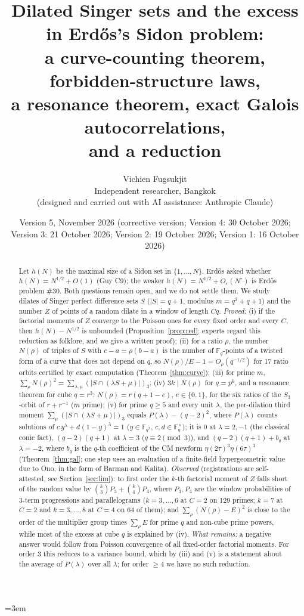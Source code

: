 \documentclass[11pt]{article}
\title{Dilated Singer sets and the excess in Erd\H{o}s's Sidon problem:\\ a curve-counting theorem, forbidden-structure laws,\\ a resonance theorem, exact Galois autocorrelations,\\ and a reduction}
\author{Vichien Fugsukjit\\ Independent researcher, Bangkok\\ \small(designed and carried out with AI assistance: Anthropic Claude)}
\date{Version 5, November 2026 (corrective version; Version 4: 30 October 2026; Version 3: 21 October 2026; Version 2: 19 October 2026; Version 1: 16 October 2026)}
\begin{document}
\emergencystretch=3em
\maketitle
\begin{abstract}
Let $h(N)$ be the maximal size of a Sidon set in $\{1,\dots,N\}$. Erd\H{o}s asked whether $h(N)=N^{1/2}+O(1)$ (Guy C9); the weaker
$h(N)=N^{1/2}+O_\varepsilon(N^\varepsilon)$ is Erd\H{o}s problem \#30. Both questions remain open, and we do not settle them. We study dilates of Singer perfect difference sets $S$
($|S|=q+1$, modulus $m=q^2+q+1$) and the number $Z$ of points of a random dilate in a window of length $Cq$.
\emph{Proved:} (i) if the factorial moments of $Z$ converge to the Poisson ones for every fixed order and every $C$, then $h(N)-N^{1/2}$ is unbounded
(Proposition~\ref{prop:red}; experts regard this reduction as folklore, and we give a written proof); (ii) for a ratio $\rho$, the number $N(\rho)$ of triples of $S$ with $c-a=\rho(b-a)$
is the number of $\mathbb F_q$-points of a twisted form of a curve that does not depend on $q$, so $N(\rho)/E-1=O_\rho(q^{-1/2})$ for 17 ratio orbits certified by exact computation (Theorem~\ref{thm:curve});
(iii) for prime $m$, $\sum_\rho N(\rho)^2=\sum_{\lambda,\mu}(|S\cap(\lambda S+\mu)|)_3$; (iv) $3k\mid N(\rho)$ for $q=p^k$, and a resonance theorem for cube $q=r^3$: $N(\rho)=r(q+1-e)$,
$e\in\{0,1\}$, for the six ratios of the $S_3$-orbit of $r+r^{-1}$ ($m$ prime); (v) for prime $q\ge5$ and every unit $\lambda$, the per-dilation third moment
$\sum_\mu(|S\cap(\lambda S+\mu)|)_3$ equals $P(\lambda)-(q-2)^2$, where $P(\lambda)$ counts solutions of $c\,y^\lambda+d(1-y)^\lambda=1$ ($y\in\mathbb F_{q^3}$, $c,d\in\mathbb F_q^\times$);
it is $0$ at $\lambda=2,-1$ (the classical conic fact), $(q-2)(q+1)$ at $\lambda=3$ ($q\equiv2\pmod3$), and $(q-2)(q+1)+b_q$ at $\lambda=-2$, where $b_q$ is the $q$-th
coefficient of the CM newform $\eta(2\tau)^3\eta(6\tau)^3$ (Theorem~\ref{thm:gal}; one step uses an evaluation of a finite-field hypergeometric value due to Ono, in the form of Barman and Kalita).
\emph{Observed} (registrations are self-attested, see Section~\ref{sec:lim}): to first order the $k$-th factorial moment of $Z$ falls short of the random value by
$\binom k3P_3+\binom k4P_4$, where $P_3,P_4$ are the window probabilities of 3-term progressions and parallelograms ($k=3,\dots,6$ at $C=2$ on 129 primes; $k=7$ at $C=2$
and $k=3,\dots,8$ at $C=4$ on 64 of them); and $\sum_\rho(N(\rho)-E)^2$ is close to the order of the multiplier group times $\sum_\rho E$ for prime $q$ and non-cube prime powers,
while most of the excess at cube $q$ is explained by (iv).
\emph{What remains:} a negative answer would follow from Poisson convergence of all fixed-order factorial moments. For order $3$ this reduces to a variance bound, which by (iii) and (v)
is a statement about the average of $P(\lambda)$ over all $\lambda$; for order $\ge4$ we have no such reduction.
\end{abstract}
\end{document}
